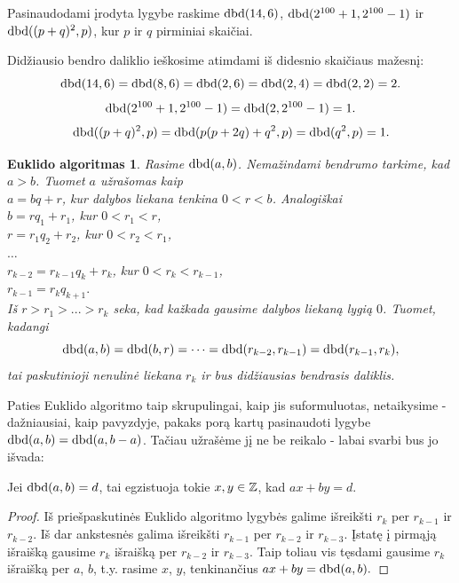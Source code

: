 \begin{pav}
  Pasinaudodami įrodyta lygybe raskime $\operatorname{dbd}(14,6)$,
  $\operatorname{dbd}(2^{100}+1, 2^{100}-1)$ ir $\operatorname{dbd}( (p+q)^2, p)$, kur $p$ ir
  $q$ pirminiai skaičiai. 
\end{pav}

\begin{sprendimas}
Didžiausio bendro daliklio ieškosime atimdami iš didesnio skaičiaus
mažesnį:
$$\operatorname{dbd}(14,6) = \operatorname{dbd}(8,6) = \operatorname{dbd}(2,6) = \operatorname{dbd}(2,4) = \operatorname{dbd}(2,2)= 2.$$
$$\operatorname{dbd}(2^{100} + 1, 2^{100} - 1) = \operatorname{dbd}(2,2^{100}-1) = 1.$$
$$\operatorname{dbd}( (p+q)^2, p) = \operatorname{dbd}(p(p + 2q) + q^2, p) = \operatorname{dbd}(q^2 , p) = 1.$$
\end{sprendimas}

\theoremstyle{plain}\newtheorem*{euklidoalg}{Euklido algoritmas}
\begin{euklidoalg} Rasime $\operatorname{dbd}(a,b)$. Nemažindami bendrumo tarkime, kad $a > b$. Tuomet $a$
užrašomas kaip \\
$a = bq + r$, kur dalybos liekana tenkina $0 < r < b$. Analogiškai \\
$b = rq_{1} + r_{1}$, kur $0 < r_{1} < r$, \\
$r = r_{1}q_{2} + r_{2}$, kur $0 < r_{2} < r_{1}$, \\
$\hdots$ \\
$r_{k-2} = r_{k-1}q_{k} + r_{k}$, kur $0 < r_{k} < r_{k-1}$,
\\
$r_{k-1} = r_{k}q_{k+1}.$ \\

Iš $r > r_{1} > ... > r_{k}$ seka, kad kažkada gausime dalybos liekaną
lygią $0$. Tuomet, kadangi $$\operatorname{dbd}(a,b) = \operatorname{dbd}(b,r) = \cdots =
\operatorname{dbd}(r_{k-2},r_{k-1}) = \operatorname{dbd}(r_{k-1},r_{k}),$$ tai paskutinioji nenulinė
liekana $r_{k}$ ir bus didžiausias bendrasis daliklis.
\end{euklidoalg}

Paties Euklido algoritmo taip skrupulingai, kaip jis suformuluotas,
netaikysime - dažniausiai, kaip pavyzdyje, pakaks porą kartų pasinaudoti
lygybe $\operatorname{dbd}(a,b) = \operatorname{dbd}(a, b-a)$. Tačiau užrašėme jį ne be reikalo - labai
svarbi bus jo išvada:

\begin{isv} 
  Jei $\operatorname{dbd}(a,b)=d$, tai egzistuoja tokie $x,y \in \mathbb Z$, kad $ax + by = d$.
\end{isv}

\begin{proof}
  Iš priešpaskutinės Euklido algoritmo lygybės galime išreikšti $r_{k}$ per
  $r_{k-1}$ ir $r_{k-2}$. Iš dar ankstesnės galima išreikšti $r_{k-1}$ per
  $r_{k-2}$ ir $r_{k−3}$. Įstatę į pirmąją išraišką gausime $r_{k}$ išraišką
  per $r_{k-2}$ ir $r_{k−3}$. Taip toliau vis tęsdami gausime $r_{k}$ išraišką
  per $a$, $b$, t.y. rasime $x$, $y$, tenkinančius $ax + by = \operatorname{dbd}(a,b).$
\end{proof}

